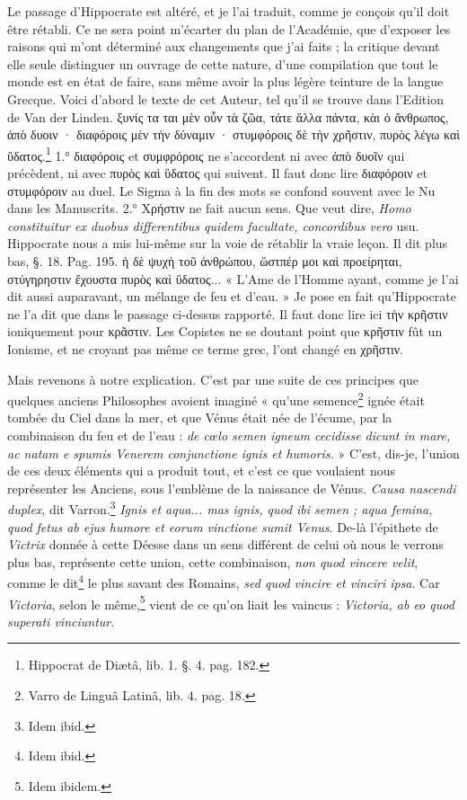 \documentclass[a4paper, 18pt, oneside]{article}
\begin{document}
Le passage d'Hippocrate est altéré, et je l'ai traduit, comme je conçois qu'il doit être rétabli. Ce ne sera point m'écarter du plan de l'Académie, que d'exposer les raisons qui m'ont déterminé aux changements que j'ai faits ; la critique devant elle seule distinguer un ouvrage de cette nature, d'une compilation que tout le monde est en état de faire, sans même avoir la plus légère teinture de la langue Grecque. Voici d'abord le texte de cet Auteur, tel qu'il se trouve dans l'Edition de Van der Linden. ξυνίς τα ται μὲν οὖν τὰ ζῶα, τάτε ἄλλα πάντα, κὰι ὁ ἄνθρωπος, ἀπὸ δυοιν · διαφόροις μὲν τὴν δύναμιν · στυμφόροις δὲ τὴν χρῆστιν, πυρὸς λέγω καὶ ὕδατος.\footnote{Hippocrat de Diætâ, lib. 1. §. 4. pag. 182.} 1.° διαφόροις et συμφρόροις ne s'accordent ni avec ἀπὸ δυοῖν qui précèdent, ni avec πυρὸς καὶ ὓδατος qui suivent. Il faut donc lire διαφόροιν et στυμφόροιν au duel. Le Sigma à la fin des mots se confond souvent avec le Nu dans les Manuscrits. 2.° Χρήστιν ne fait aucun sens. Que veut dire, \emph{Homo constituitur ex duobus differentibus quidem facultate, concordibus vero} usu. Hippocrate nous a mis lui-même sur la voie de rétablir la vraie leçon. Il dit plus bas, §. 18. Pag. 195. ἡ δὲ ψυχὴ τοῦ ἀνθρώπου, ὥστπέρ μοι καὶ προείρηται, στὐγηρηστιν ἔχουστα πυρὸς καὶ ὕδατος... « L'Ame de l'Homme ayant, comme je l'ai dit aussi auparavant, un mélange de feu et d'eau. » Je pose en fait qu'Hippocrate ne l'a dit que dans le passage ci-dessus rapporté. Il faut donc lire ici τὴν κρῆστιν ioniquement pour κρᾶστιν. Les Copistes ne se doutant point que κρῆστιν fût un Ionisme, et ne croyant pas même ce terme grec, l'ont changé en χρῆστιν.

Mais revenons à notre explication. C'est par une suite de ces principes que quelques anciens Philosophes avoient imaginé « qu'une semence\footnote{Varro de Linguâ Latinâ, lib. 4. pag. 18.} ignée était tombée du Ciel dans la mer, et que Vénus était née de l'écume, par la combinaison du feu et de l'eau : \emph{de cœlo semen igneum cecidisse dicunt in mare, ac natam e spumis Venerem conjunctione ignis et humoris.} » C'est, dis-je, l'union de ces deux éléments qui a produit tout, et c'est ce que voulaient nous représenter les Anciens, sous l'emblème de la naissance de Vénus. \emph{Causa nascendi duplex}, dit Varron.\footnote{Idem ibid.} \emph{Ignis et aqua... mas ignis, quod ibi semen ; aqua femina, quod fetus ab ejus humore et eorum vinctione sumit Venus}. De-là l'épithete de \emph{Victrix} donnée à cette Déesse dans un sens différent de celui où nous le verrons plus bas, représente cette union, cette combinaison, \emph{non quod vincere velit}, comme le dit\footnote{Idem ibid.} le plus savant des Romains, \emph{sed quod vincire et vinciri ipsa}. Car \emph{Victoria}, selon le même,\footnote{Idem ibidem.} vient de ce qu'on liait les vaincus : \emph{Victoria, ab eo quod superati vinciuntur}.
\end{document}

